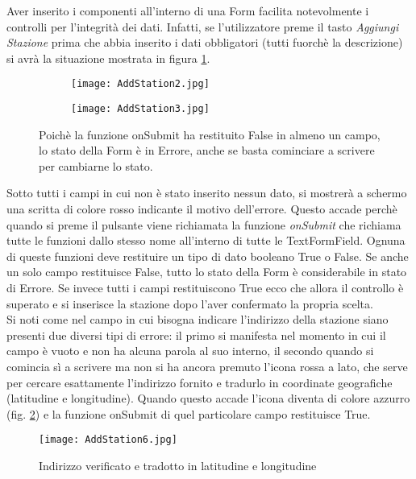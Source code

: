 Aver
inserito i componenti all'interno di una Form facilita notevolmente i controlli
per l'integrità dei dati. Infatti, se l'utilizzatore preme il tasto
\textit{Aggiungi Stazione} prima che abbia inserito i dati obbligatori (tutti
fuorchè la descrizione) si avrà la situazione mostrata in figura \ref{addStation2}.
\begin{figure}[!h]
    \centering
    \begin{subfigure}{0.36\linewidth}
        \texttt{[image: AddStation2.jpg]}
    \end{subfigure}
    \begin{subfigure}{0.36\linewidth}
        \texttt{[image: AddStation3.jpg]}
    \end{subfigure}
    \caption{Poichè la funzione onSubmit ha restituito False in almeno un campo,
    lo stato della Form è in Errore, anche se basta cominciare a scrivere
    per cambiarne lo stato.}
    \label{addStation2}
\end{figure}
Sotto tutti i campi in cui non è stato inserito nessun dato, si mostrerà a
schermo una scritta di colore rosso indicante il motivo dell'errore. Questo
accade perchè quando si preme il pulsante viene richiamata la funzione
\textit{onSubmit} che richiama tutte le funzioni dallo stesso nome all'interno
di tutte le TextFormField. Ognuna di queste funzioni deve restituire un tipo di
dato booleano
True o False. Se anche un solo campo restituisce False, tutto lo stato della
Form è considerabile in stato di Errore. Se invece tutti i campi restituiscono
True ecco che allora il controllo è superato e si inserisce la stazione dopo
l'aver confermato la propria scelta. \\
Si  noti come nel campo in cui bisogna indicare l'indirizzo della stazione siano
presenti due diversi tipi di errore: il primo si manifesta nel momento in cui il
campo è vuoto e non ha alcuna parola al suo interno, il secondo quando si
comincia sì a scrivere ma non si ha ancora premuto l'icona rossa a lato, che
serve per cercare esattamente l'indirizzo fornito e tradurlo in coordinate
geografiche (latitudine e longitudine). Quando questo accade l'icona diventa di
colore azzurro (fig. \ref{addStation6}) e la funzione onSubmit di quel particolare campo
restituisce True.
\begin{figure}[!h]
    \centering
    \texttt{[image: AddStation6.jpg]}
    \caption{Indirizzo verificato e tradotto in latitudine e longitudine}
    \label{addStation6}
\end{figure}  

